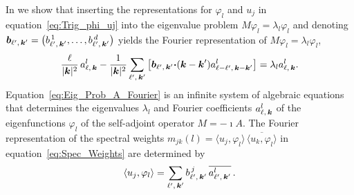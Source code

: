 \documentclass[amsa]{ipart}
\begin{document}
In  we show that inserting the
representations for $\varphi_l$ and $u_j$ in equation~\eqref{eq:Trig_phi_uj}
into the eigenvalue problem $M\varphi_l=\lambda_l\varphi_l$ and denoting
$\boldsymbol{b}_{\ell^\prime,\,\boldsymbol{k}^\prime}=\big(b^{\,1}_{\ell^\prime,\,\boldsymbol{k}^\prime},\ldots,b^{\,d}_{\ell^\prime,\,\boldsymbol{k}^\prime}\big)$
yields the Fourier representation of $M\varphi_l=\lambda_l\varphi_l$, 
%
\begin{align}\label{eq:Eig_Prob_A_Fourier}
  \frac{\ell}{|\veck|^2}\,a^l_{\ell,\,\veck}
  -
   \frac{1}{|\veck|^2}
  \sum_{\ell^\prime,\,\veck^\prime}    
  \left[
    \vecb_{\ell^\prime,\,\veck^\prime}\bcdot(\veck-\veck^\prime)
    a^l_{\ell-\ell^\prime,\,\veck-\veck^\prime}
  \right] 
  =\lambda_la^l_{\ell,\,\veck}.
\end{align}
%
Equation~\eqref{eq:Eig_Prob_A_Fourier} is an infinite system of
algebraic equations that determines the eigenvalues $\lambda_l$ and Fourier 
coefficients $a^l_{\ell,\,\boldsymbol{k}}$ of the eigenfunctions $\varphi_l$ of the
self-adjoint operator $M=-\imath A$. 
The Fourier representation of the spectral weights
$m_{jk}(l)=\langle u_j,\varphi_l\rangle\,\overline{\langle u_k,\varphi_l\rangle}$ in equation~\eqref{eq:Spec_Weights}
are determined by
%
\begin{align}\label{eq:Inner_Products_Gen}
  \langle u_j,\varphi_l\rangle=\sum_{\ell^\prime,\,\veck^\prime}
   b^{\,j}_{\ell^\prime,\,\veck^\prime}\,\overline{a^l_{\ell^\prime,\,\veck^\prime}}\,.
\end{align}
%
\end{document}
